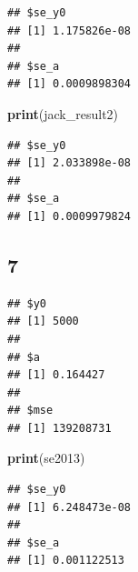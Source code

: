 \documentclass[
]{article}
\newenvironment{Shaded}{\begin{snugshade}}{\end{snugshade}}
\newcommand{\AttributeTok}[1]{\textcolor[rgb]{0.13,0.29,0.53}{#1}}
\newcommand{\CommentTok}[1]{\textcolor[rgb]{0.56,0.35,0.01}{\textit{#1}}}
\newcommand{\ConstantTok}[1]{\textcolor[rgb]{0.56,0.35,0.01}{#1}}
\newcommand{\DecValTok}[1]{\textcolor[rgb]{0.00,0.00,0.81}{#1}}
\newcommand{\FloatTok}[1]{\textcolor[rgb]{0.00,0.00,0.81}{#1}}
\newcommand{\FunctionTok}[1]{\textcolor[rgb]{0.13,0.29,0.53}{\textbf{#1}}}
\newcommand{\NormalTok}[1]{#1}
\newcommand{\OtherTok}[1]{\textcolor[rgb]{0.56,0.35,0.01}{#1}}
\newcommand{\SpecialCharTok}[1]{\textcolor[rgb]{0.81,0.36,0.00}{\textbf{#1}}}
\newcommand{\StringTok}[1]{\textcolor[rgb]{0.31,0.60,0.02}{#1}}
\begin{document}
\begin{verbatim}
## $se_y0
## [1] 1.175826e-08
## 
## $se_a
## [1] 0.0009898304
\end{verbatim}

\begin{Shaded}
\begin{Highlighting}[]
\FunctionTok{print}\NormalTok{(jack\_result2)}
\end{Highlighting}
\end{Shaded}

\begin{verbatim}
## $se_y0
## [1] 2.033898e-08
## 
## $se_a
## [1] 0.0009979824
\end{verbatim}

\subsection{7}\label{section-6}

\begin{Shaded}
\end{Shaded}

\begin{verbatim}
## $y0
## [1] 5000
## 
## $a
## [1] 0.164427
## 
## $mse
## [1] 139208731
\end{verbatim}

\begin{Shaded}
\begin{Highlighting}[]
\FunctionTok{print}\NormalTok{(se2013)}
\end{Highlighting}
\end{Shaded}

\begin{verbatim}
## $se_y0
## [1] 6.248473e-08
## 
## $se_a
## [1] 0.001122513
\end{verbatim}
\end{document}
